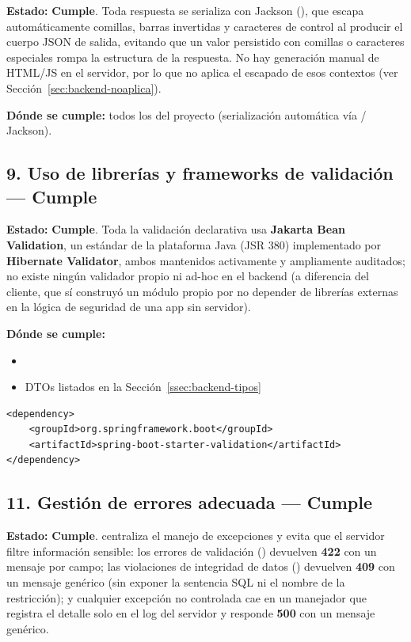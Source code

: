 \documentclass[11pt,a4paper]{article}
\newcommand{\Cumple}{\textcolor{cumpleColor}{\textbf{Cumple}}}
\begin{document}
\textbf{Estado:} \Cumple. Toda respuesta se serializa con Jackson (\texttt{}), que escapa automáticamente comillas, barras invertidas y caracteres de control al producir el cuerpo JSON de salida, evitando que un valor persistido con comillas o caracteres especiales rompa la estructura de la respuesta. No hay generación manual de HTML/JS en el servidor, por lo que no aplica el escapado de esos contextos (ver Sección~\ref{sec:backend-noaplica}).

\textbf{Dónde se cumple:} todos los \texttt{} del proyecto (serialización automática vía \texttt{} / Jackson).

\subsection{9. Uso de librerías y frameworks de validación --- \Cumple}

\textbf{Estado:} \Cumple. Toda la validación declarativa usa \textbf{Jakarta Bean Validation}, un estándar de la plataforma Java (JSR 380) implementado por \textbf{Hibernate Validator}, ambos mantenidos activamente y ampliamente auditados; no existe ningún validador propio ni ad-hoc en el backend (a diferencia del cliente, que sí construyó un módulo propio por no depender de librerías externas en la lógica de seguridad de una app sin servidor).

\textbf{Dónde se cumple:}
\begin{itemize}[leftmargin=1.2cm,nosep]
\item \texttt{}
\item DTOs listados en la Sección~\ref{ssec:backend-tipos}
\end{itemize}

\begin{lstlisting}[style=xmlstyle,caption={Dependencia que habilita Jakarta Bean Validation / Hibernate Validator (pom.xml)}]
<dependency>
    <groupId>org.springframework.boot</groupId>
    <artifactId>spring-boot-starter-validation</artifactId>
</dependency>
\end{lstlisting}

\subsection{11. Gestión de errores adecuada --- \Cumple}

\textbf{Estado:} \Cumple. \texttt{} centraliza el manejo de excepciones y evita que el servidor filtre información sensible: los errores de validación (\texttt{}) devuelven \textbf{422} con un mensaje por campo; las violaciones de integridad de datos (\texttt{}) devuelven \textbf{409} con un mensaje genérico (sin exponer la sentencia SQL ni el nombre de la restricción); y cualquier excepción no controlada cae en un manejador \texttt{} que registra el detalle solo en el log del servidor y responde \textbf{500} con un mensaje genérico.
\end{document}
